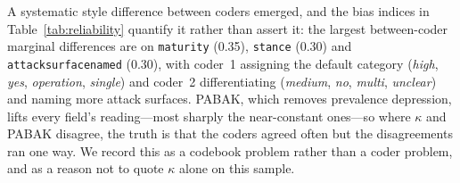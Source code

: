 \documentclass[preprint,12pt]{elsarticle}
\renewcommand{\_}{\plainunderscore\allowbreak}
\begin{document}
A systematic style difference between coders emerged, and the bias indices in
Table~\ref{tab:reliability} quantify it rather than assert it: the largest between-coder
marginal differences are on \texttt{maturity} (0.35), \texttt{stance} (0.30) and
\texttt{attack\_surface\_named} (0.30), with coder~1 assigning the default category
(\emph{high}, \emph{yes}, \emph{operation}, \emph{single}) and coder~2 differentiating
(\emph{medium}, \emph{no}, \emph{multi}, \emph{unclear}) and naming more attack surfaces.
PABAK, which removes prevalence depression, lifts every field's reading---most sharply the
near-constant ones---so where $\kappa$ and PABAK disagree, the truth is that the coders
agreed often but the disagreements ran one way. We record this as a codebook problem rather
than a coder problem, and as a reason not to quote $\kappa$ alone on this sample.
\end{document}
